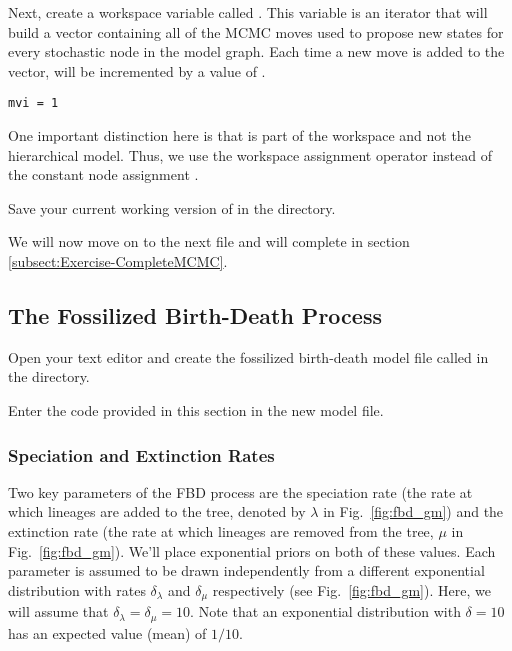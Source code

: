 Next, create a workspace variable called . 
This variable is an iterator that will build a vector containing all of the MCMC moves used to propose new states for every stochastic node in the model graph. 
Each time a new move is added to the vector,  will be incremented by a value of .
{\tt \begin{snugshade*}
\begin{lstlisting}
mvi = 1
\end{lstlisting}
\end{snugshade*}}
One important distinction here is that  is part of the \RevBayes workspace and not the hierarchical model. 
Thus, we use the workspace assignment operator \cl{=} instead of the constant node assignment \cl{<-}. 

{\begin{framed}
Save your current working version of  in the  directory.

We will now move on to the next \Rev file and will complete  in section \ref{subsect:Exercise-CompleteMCMC}.
\end{framed}}


\bigskip
\subsection{The Fossilized Birth-Death Process}\label{subsect:Exercise-ModelFBD}

{\begin{framed}
Open your text editor and create the fossilized birth-death model file called {\textcolor{red}{}} in the  directory.

Enter the \Rev code provided in this section in the new model file.
\end{framed}}

\subsubsection{Speciation and Extinction Rates}\label{subsub:Exercise-FBD-SpeciationExtinction}

Two key parameters of the FBD process are the speciation rate (the rate at which lineages are added to the tree, denoted by $\lambda$ in Fig.\ \ref{fig:fbd_gm}) and the extinction rate (the rate at which lineages are removed from the tree, $\mu$ in Fig.\ \ref{fig:fbd_gm}). 
We'll place exponential priors on both of these values. 
Each parameter is assumed to be drawn independently from a different exponential distribution with rates $\delta_{\lambda}$ and $\delta_{\mu}$ respectively (see Fig.\ \ref{fig:fbd_gm}). 
Here, we will assume that $\delta_{\lambda} = \delta_{\mu} = 10$. 
Note that an exponential distribution with $\delta = 10$ has an expected value (mean) of $1/10$. 

